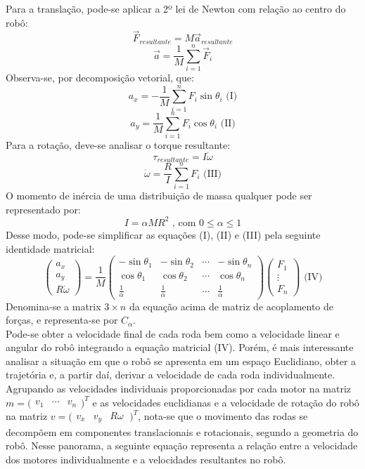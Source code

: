 \documentclass{article}
\begin{document}
Para a translação, pode-se aplicar a 2º lei de Newton com relação ao centro do robô:
\[\vec{F}_{resultante} = M\vec{a}_{resultante}\]
\[\vec{a}=\frac{1}{M}\sum_{i=1}^{n}\vec{F}_i\]
\hspace{1cm}Observa-se, por decomposição vetorial, que:
\[a_x=-\frac{1}{M}\sum_{i=1}^{n}F_i\sin\theta_i \text{ (I)}  \]     
\[a_y=\frac{1}{M}\sum_{i=1}^{n}F_i\cos\theta_i \text{ (II)}\]	
\hspace{1cm}Para a rotação, deve-se analisar o torque resultante:
\[\tau_{resultante}=I\dot{\omega}\]
\[\dot{\omega}=\frac{R}{I}\sum_{i=1}^{n}F_i \text{ (III)}\]
\hspace{1cm}O momento de inércia de uma distribuição de massa qualquer pode ser representado por:
\[I=\alpha MR^2\text{ , com } 0\leq\alpha\leq1\]
\hspace{1cm}Desse modo, pode-se simplificar as equações (I), (II) e (III) pela seguinte identidade matricial:
\[
\begin{pmatrix}a_{x}\\a_{y}\\R\dot{\omega} \end{pmatrix}
=\frac{1}{M}
\begin{pmatrix}
  -\sin\theta_1 & -\sin\theta_2 & \cdots & -\sin\theta_n \\
  \cos\theta_1 & \cos\theta_2 & \cdots & \cos\theta_n \\
  \frac{1}{\alpha} & \frac{1}{\alpha} &\cdots & \frac{1}{\alpha}
 \end{pmatrix}
\begin{pmatrix}F_{1}\\ \vdots \\ F_{n} \end{pmatrix} \text{ (IV)}
\]
\hspace{1cm}Denomina-se a matrix $3 \times n$ da equação acima de matriz de acoplamento de forças, e representa-se por \( C_\alpha \). \\
\hspace{1cm}Pode-se obter a velocidade final de cada roda bem como a velocidade linear e angular do robô integrando a equação matricial (IV). Porém, é mais interessante analisar a situação em que o robô se apresenta em um espaço Euclidiano, obter a trajetória e, a partir daí, derivar a velocidade de cada roda individualmente.\\
\hspace{1cm}Agrupando as velocidades individuais proporcionadas por cada motor na matriz $m=\bigl(\begin{smallmatrix}v_{1}&\cdots&v_{n} \end{smallmatrix})^T$ e as velocidades euclidianas e a velocidade de rotação do robô na matriz  $v=\bigl(\begin{smallmatrix}v_{x}&v_{y}&R{\omega}\ \end{smallmatrix})^T$, nota-se que o movimento das rodas se decompõem em componentes translacionais e rotacionais, segundo a geometria do robô. Nesse panorama, a seguinte equação representa a relação entre a velocidade dos motores individualmente e a velocidades resultantes no robô.
\end{document}
